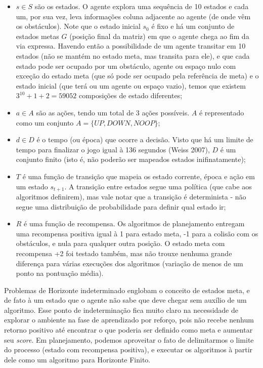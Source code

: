 \documentclass[letterpaper]{article} %
\begin{document}
\begin{itemize}

\item $s \in S$ são os estados. O agente explora uma sequência de 10 estados e cada um, por sua vez, leva informações coluna adjacente ao agente (de onde vêm os obstáculos). Note que o estado inicial $s_0$ é fixo e há um conjunto de estados metas $G$ (posição final da matriz) em que o agente chega ao fim da via expressa. Havendo então a possibilidade de um agente transitar em 10 estados (não se mantém no estado meta, mas transita para ele), e que cada estado pode ser ocupado por um obstáculo, agente ou espaço nulo com exceção do estado meta (que só pode ser ocupado pela referência de meta) e o estado inicial (que terá ou um agente ou espaço vazio), temos que existem $3^{10} + 1 + 2 = 59052$ composições de estado diferentes;

\item $a \in A$ são as ações, tendo um total de 3 ações possíveis. $A$ é representado como um conjunto $A = \{UP, DOWN, NOOP\}$;

\item $d \in D$ é o tempo (ou época) que ocorre a decisão. Visto que há um limite de tempo para finalizar o jogo igual à 136 segundos (Weiss 2007), $D$ é um conjunto finito (isto é, não poderão ser mapeados estados inifinatamente);

\item $T$ é uma função de transição que mapeia os estado corrente, época e ação em um estado $s_{t+1}$. A transição entre estados segue uma política (que cabe aos algoritmos definirem), mas vale notar que a transição é determinista - não segue uma distribuição de probabilidade para definir qual estado ir;

\item $R$ é uma função de recompensa. Os algoritmos de planejamento entregam uma recompensa positiva igual à 1 para estado meta, -1 para a colisão com os obstáculos, e nula para qualquer outra posição. O estado meta com recompensa +2 foi testado também, mas não trouxe nenhuma grande diferença para várias execuções dos algoritmos (variação de menos de um ponto na pontuação média).

\end{itemize}

Problemas de Horizonte indeterminado englobam o conceito de estados meta, e de fato à um estado que o agente não sabe que deve chegar sem auxílio de um algoritmo. Esse ponto de indeterminação fica muito claro na necessidade de explorar o ambiente na fase de aprendizado por reforço, pois não recebe nenhum retorno positivo até encontrar o que poderia ser definido como meta e aumentar seu \textit{score}. Em planejamento, podemos aproveitar o fato de delimitarmos o limite do processo (estado com recompensa positiva), e executar os algoritmos à partir dele como um algoritmo para Horizonte Finito.
\end{document}
